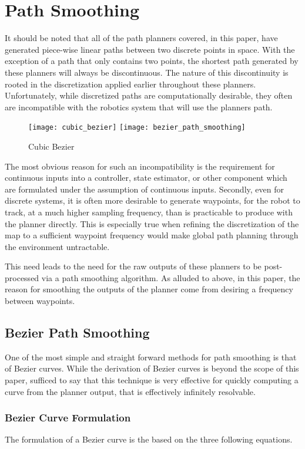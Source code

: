 \section{Path Smoothing}
It should be noted that all of the path planners covered, in this paper, have generated piece-wise linear paths between two discrete points in space. With the exception of a path that only contains two points, the shortest path generated by these planners will always be discontinuous. The nature of this discontinuity is rooted in the discretization applied earlier throughout these planners. Unfortunately, while discretized paths are computationally desirable, they often are incompatible with the robotics system that will use the planners path.

\begin{figure}[h]
    \texttt{[image: cubic\_bezier]}
    \texttt{[image: bezier\_path\_smoothing]}
    \centering
    \label{fig:bezier}
    \caption{Cubic Bezier}
  \end{figure}

The most obvious reason for such an incompatibility is the requirement for continuous inputs into a controller, state estimator, or other component which are formulated under the assumption of continuous inputs. Secondly, even for discrete systems, it is often more desirable to generate waypoints, for the robot to track, at a much higher sampling frequency, than is practicable to produce with the planner directly. This is especially true when refining the discretization of the map to a sufficient waypoint frequency would make global path planning through the environment untractable.

This need leads to the need for the raw outputs of these planners to be post-processed via a path smoothing algorithm. As alluded to above, in this paper, the reason for smoothing the outputs of the planner come from desiring a frequency between waypoints.

\subsection{Bezier Path Smoothing}
One of the most simple and straight forward methods for path smoothing is that of Bezier curves. While the derivation of Bezier curves is beyond the scope of this paper, sufficed to say that this technique is very effective for quickly computing a curve from the planner output, that is effectively infinitely resolvable.

\subsubsection{Bezier Curve Formulation}
The formulation of a Bezier curve is the based on the three following equations. 


